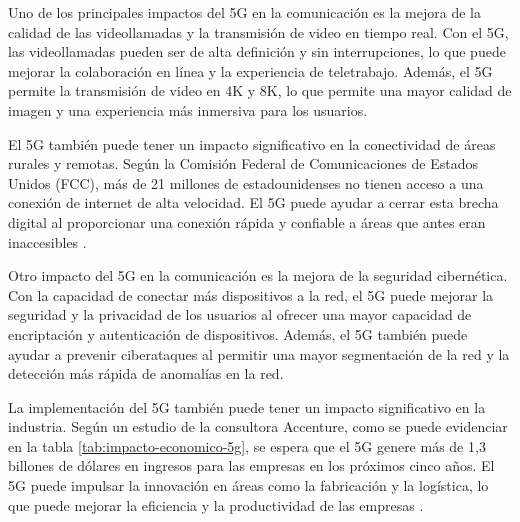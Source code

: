 \documentclass[12pt]{article}
\begin{document}
            Uno de los principales impactos del 5G en la comunicación es la mejora de la calidad de las videollamadas y la transmisión de video en tiempo real. Con el 5G, las videollamadas pueden ser de alta definición y sin interrupciones, lo que puede mejorar la colaboración en línea y la experiencia de teletrabajo. Además, el 5G permite la transmisión de video en 4K y 8K, lo que permite una mayor calidad de imagen y una experiencia más inmersiva para los usuarios.
            
            El 5G también puede tener un impacto significativo en la conectividad de áreas rurales y remotas. Según la Comisión Federal de Comunicaciones de Estados Unidos (FCC), más de 21 millones de estadounidenses no tienen acceso a una conexión de internet de alta velocidad. El 5G puede ayudar a cerrar esta brecha digital al proporcionar una conexión rápida y confiable a áreas que antes eran inaccesibles \cite{davidson2019impact}.
            
            Otro impacto del 5G en la comunicación es la mejora de la seguridad cibernética. Con la capacidad de conectar más dispositivos a la red, el 5G puede mejorar la seguridad y la privacidad de los usuarios al ofrecer una mayor capacidad de encriptación y autenticación de dispositivos. Además, el 5G también puede ayudar a prevenir ciberataques al permitir una mayor segmentación de la red y la detección más rápida de anomalías en la red.
            
            La implementación del 5G también puede tener un impacto significativo en la industria. Según un estudio de la consultora Accenture, como se puede evidenciar en la tabla \ref{tab:impacto-economico-5g}, se espera que el 5G genere más de 1,3 billones de dólares en ingresos para las empresas en los próximos cinco años. El 5G puede impulsar la innovación en áreas como la fabricación y la logística, lo que puede mejorar la eficiencia y la productividad de las empresas \cite{wang2020impact}.
\end{document}
